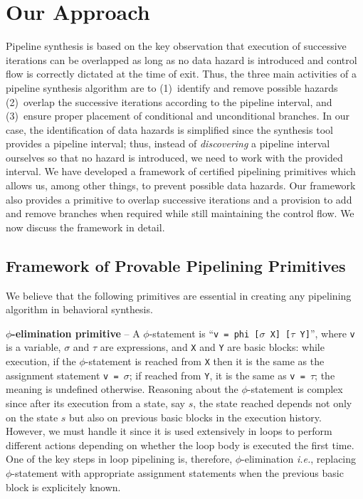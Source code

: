 \chapter{Our Approach}
\label{sec:pipelining-algorithm}

Pipeline synthesis is based on the key observation that
execution of successive iterations can be overlapped as long
as no data hazard is introduced and control flow is correctly dictated at the time of exit. Thus, the three main
activities of a pipeline synthesis algorithm are to
(1)~identify and remove possible hazards (2)~overlap the
successive iterations according to the pipeline interval, and (3)~ensure proper placement of conditional and unconditional branches. In our case,
the identification of data hazards is simplified since the synthesis tool
provides a pipeline interval; thus, instead of {\em
discovering} a pipeline interval ourselves so that no
hazard is introduced, we need to work with the
provided interval. We have developed a framework of certified pipelining
primitives which allows us, among other things, to prevent possible data
hazards. Our framework also provides a primitive
to overlap successive iterations and a provision to add and remove branches when required while still maintaining the control flow. We now discuss
the framework in detail.

\section{Framework of Provable Pipelining Primitives}

We believe that the following primitives are essential in creating any pipelining
algorithm in behavioral synthesis.

{\textbf {$\phi$-elimination primitive}} -- A $\phi$-statement is ``{\tt v = phi
[$\sigma$ X] [$\tau$ Y]}'', where {\tt v} is a
variable, $\sigma$ and $\tau$ are expressions, and {\tt X}
and {\tt Y} are basic blocks: while execution, if the $\phi$-statement is
reached from {\tt X} then it
is the same as the assignment statement
{\tt v = $\sigma$}; if reached from {\tt Y}, it is the same as {\tt v = $\tau$};
the meaning is undefined otherwise.
Reasoning about the $\phi$-statement is complex since after its
execution from a state, say $s$, the state reached depends not only
on the state $s$ but also on previous basic blocks in the execution history.
However, we must handle it since it is used extensively in
loops to perform different actions depending on whether the
loop body is executed the first time. One of the key steps in loop pipelining is,
therefore, $\phi$-elimination {\em i.e.}, replacing
$\phi$-statement with appropriate assignment statements when the previous basic block is explicitely known.


